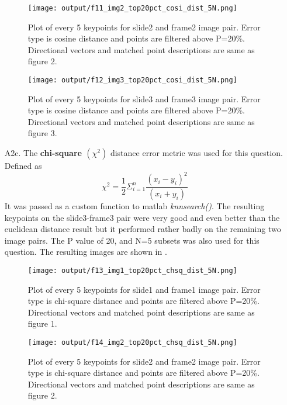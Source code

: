 \documentclass[12pt]{report}
\begin{document}
\begin{enumerate}
    \begin{figure}[H]
        \centering
        \texttt{[image: output/f11\_img2\_top20pct\_cosi\_dist\_5N.png]}
        \caption{Plot of every 5 keypoints for slide2 and frame2 image pair. Error type is cosine distance and points are filtered above P=20\%. Directional 
        vectors and matched point descriptions are same as figure 2.}
        \label{fig:Figure11}
    \end{figure}

    \begin{figure}[H]
        \centering
        \texttt{[image: output/f12\_img3\_top20pct\_cosi\_dist\_5N.png]}
        \caption{Plot of every 5 keypoints for slide3 and frame3 image pair. Error type is cosine distance and points are filtered above P=20\%. Directional 
        vectors and matched point descriptions are same as figure 3.}
        \label{fig:Figure12}
    \end{figure}

    \item[A2c.] The \textbf{chi-square $(\chi^2)$} distance error metric was used for this question. Defined as 
    \[
    \chi^2 = \frac{1}{2} \Sigma^n_{i=1} \frac{(x_i - y_i)^2}{(x_i + y_i)}
    \]
    It was passed as a custom function to matlab \emph{knnsearch()}. The resulting keypoints on the slide3-frame3 pair were very good and even better than the euclidean 
    distance result but it performed rather badly on the remaining two image pairs. The P value of 20, and N=5 subsets was also used for this question. The resulting 
    images are shown in .

    \begin{figure}[H]
        \centering
        \texttt{[image: output/f13\_img1\_top20pct\_chsq\_dist\_5N.png]}
        \caption{Plot of every 5 keypoints for slide1 and frame1 image pair. Error type is chi-square distance and points are filtered above P=20\%. Directional 
        vectors and matched point descriptions are same as figure 1.}
        \label{fig:Figure13}
    \end{figure}

    \begin{figure}[H]
        \centering
        \texttt{[image: output/f14\_img2\_top20pct\_chsq\_dist\_5N.png]}
        \caption{Plot of every 5 keypoints for slide2 and frame2 image pair. Error type is chi-square distance and points are filtered above P=20\%. Directional 
        vectors and matched point descriptions are same as figure 2.}
        \label{fig:Figure14}
    \end{figure}


\end{enumerate}
\end{document}
